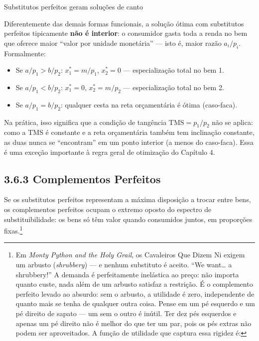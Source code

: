 \documentclass[11pt,twoside,openright]{book}
\providecommand{\tightlist}{\setlength{\itemsep}{0pt}\setlength{\parskip}{0pt}}
\begin{document}
\begin{warningbox}{Substitutos perfeitos geram soluções de canto}

Diferentemente das demais formas funcionais, a solução ótima com
substitutos perfeitos tipicamente \textbf{não é interior}: o consumidor
gasta toda a renda no bem que oferece maior ``valor por unidade
monetária'' --- isto é, maior razão \(a_i/p_i\). Formalmente:

\begin{itemize}
\tightlist
\item
  Se \(a/p_1 > b/p_2\): \(x_1^* = m/p_1\), \(x_2^* = 0\) ---
  especialização total no bem 1.
\item
  Se \(a/p_1 < b/p_2\): \(x_1^* = 0\), \(x_2^* = m/p_2\) ---
  especialização total no bem 2.
\item
  Se \(a/p_1 = b/p_2\): qualquer cesta na reta orçamentária é ótima
  (caso-faca).
\end{itemize}

Na prática, isso significa que a condição de tangência
\(\text{TMS} = p_1/p_2\) não se aplica: como a TMS é constante e a reta
orçamentária também tem inclinação constante, as duas nunca se
``encontram'' em um ponto interior (a menos do caso-faca). Essa é uma
exceção importante à regra geral de otimização do Capítulo 4.

\end{warningbox}

\subsection{3.6.3 Complementos Perfeitos}\label{complementos-perfeitos}

Se os substitutos perfeitos representam a máxima disposição a trocar
entre bens, os complementos perfeitos ocupam o extremo oposto do
espectro de substituibilidade: os bens só têm valor quando consumidos
juntos, em proporções fixas.\footnote{Em \emph{Monty Python and the Holy
  Grail}, os Cavaleiros Que Dizem Ni exigem um arbusto
  (\emph{shrubbery}) --- e nenhum substituto é aceito. ``We want\ldots{}
  a shrubbery!'' A demanda é perfeitamente inelástica ao preço: não
  importa quanto custe, nada além de um arbusto satisfaz a restrição. É
  o complemento perfeito levado ao absurdo: sem o arbusto, a utilidade é
  zero, independente de quanto mais se tenha de qualquer outra coisa.
  Pense em um pé esquerdo e um pé direito de sapato --- um sem o outro é
  inútil. Ter dez pés esquerdos e apenas um pé direito não é melhor do
  que ter um par, pois os pés extras não podem ser aproveitados. A
  função de utilidade que captura essa rigidez é:}
\end{document}
